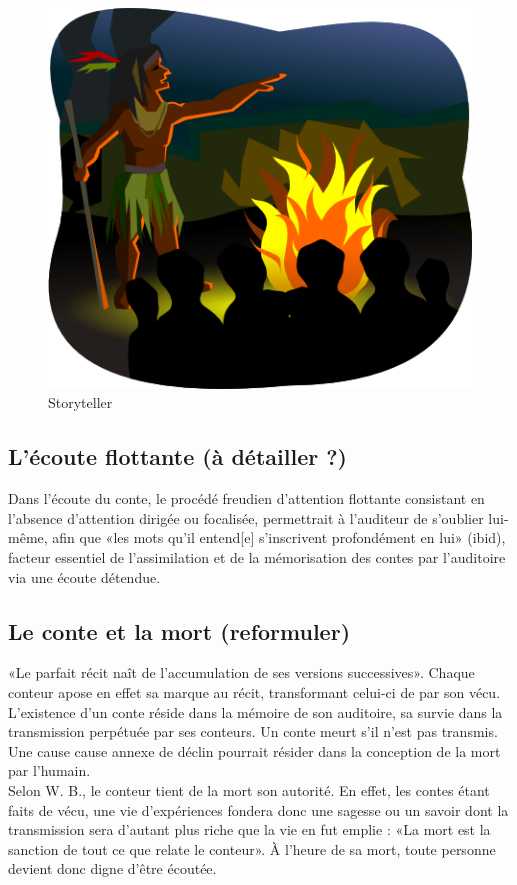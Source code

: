\documentclass[a4paper,12pt,final,oneside]{article}
\begin{document}
\begin{figure}[h!]
    \centering
    \includegraphics[width=0.80\linewidth]{img/storyteller.png}
    \caption{Storyteller}
\end{figure}

\subsection{L'écoute flottante (à détailler ?)}
Dans l'écoute du conte, le procédé freudien d'attention flottante consistant en l'absence d'attention dirigée ou focalisée, permettrait à l'auditeur de s'oublier lui-même, afin que «les mots qu'il entend[e] s'inscrivent profondément en lui» (ibid), facteur essentiel de l'assimilation et de la mémorisation des contes par l'auditoire via une écoute détendue.\\

\subsection{Le conte et la mort (reformuler)}
«Le parfait récit naît de l'accumulation de ses versions successives». Chaque conteur apose en effet sa marque au récit, transformant celui-ci de par son vécu.\\
L'existence d'un conte réside dans la mémoire de son auditoire, sa survie dans la transmission perpétuée par ses conteurs. Un conte meurt s'il n'est pas transmis.\\
Une cause cause annexe de déclin pourrait résider dans la conception de la mort par l'humain.\\
Selon W. B., le conteur tient de la mort son autorité. En effet, les contes étant faits de vécu, une vie d'expériences fondera donc une sagesse ou un savoir dont la transmission sera d'autant plus riche que la vie en fut emplie :  «La mort est la sanction de tout ce que relate le conteur». À l'heure de sa mort, toute personne devient donc digne d'être écoutée.\\
\end{document}
